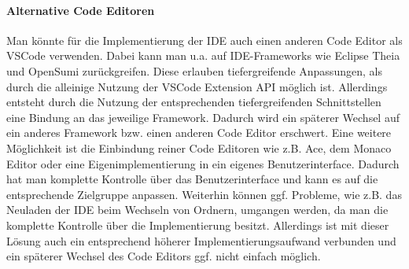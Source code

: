 \paragraph{Alternative Code Editoren} Man könnte für die Implementierung der IDE auch einen anderen Code Editor als \ac{VSCode} verwenden. Dabei kann man u.a. auf IDE-Frameworks wie Eclipse Theia und OpenSumi zurückgreifen. Diese erlauben tiefergreifende Anpassungen, als durch die alleinige Nutzung der VSCode Extension API möglich ist. Allerdings entsteht durch die Nutzung der entsprechenden tiefergreifenden Schnittstellen eine Bindung an das jeweilige Framework. Dadurch wird ein späterer Wechsel auf ein anderes Framework bzw. einen anderen Code Editor erschwert. Eine weitere Möglichkeit ist die Einbindung reiner Code Editoren wie z.B. Ace, dem Monaco Editor oder eine Eigenimplementierung in ein eigenes Benutzerinterface. Dadurch hat man komplette Kontrolle über das Benutzerinterface und kann es auf die entsprechende Zielgruppe anpassen. Weiterhin können ggf. Probleme, wie z.B. das Neuladen der IDE beim Wechseln von Ordnern, umgangen werden, da man die komplette Kontrolle über die Implementierung besitzt. Allerdings ist mit dieser Lösung auch ein entsprechend höherer Implementierungsaufwand verbunden und ein späterer Wechsel des Code Editors ggf. nicht einfach möglich.